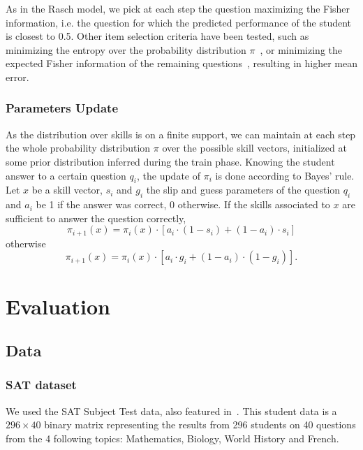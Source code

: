 \documentclass{sig-alternate}
\begin{document}
As in the Rasch model, we pick at each step the question maximizing the Fisher information, i.e. the question for which the predicted performance of the student is closest to 0.5. Other item selection criteria have been tested, such as minimizing the entropy over the probability distribution $\pi$~\cite{Huebner2010}, or minimizing the expected Fisher information of the remaining questions~\cite{MagisRaiche2012}, resulting in higher mean error.

\subsubsection{Parameters Update}

As the distribution over skills is on a finite support, we can maintain at each step the whole probability distribution $\pi$ over the possible skill vectors, initialized at some prior distribution inferred during the train phase.
Knowing the student answer to a certain question $q_i$, the update of $\pi_i$ is done according to Bayes' rule. Let $x$ be a skill vector, $s_i$ and $g_i$ the slip and guess parameters of the question $q_i$ and $a_i$ be 1 if the answer was correct, 0 otherwise. If the skills associated to $x$ are sufficient to answer the question correctly,
\[ \pi_{i+1}(x) = \pi_i(x) \cdot [a_i \cdot(1-s_i) + (1-a_i)\cdot s_i] \]
otherwise
\[ \pi_{i+1}(x) = \pi_i(x) \cdot [a_i \cdot g_i + (1-a_i)\cdot(1-g_i)]. \]

\section{Evaluation}

\subsection{Data} %

\subsubsection{SAT dataset}

We used the SAT Subject Test data, also featured in~\cite{Winters2005, Desmarais2011}. This student data is a $296 \times 40$ binary matrix representing the results from 296 students on 40 questions from the 4 following topics: Mathematics, Biology, World History and French.
\end{document}
